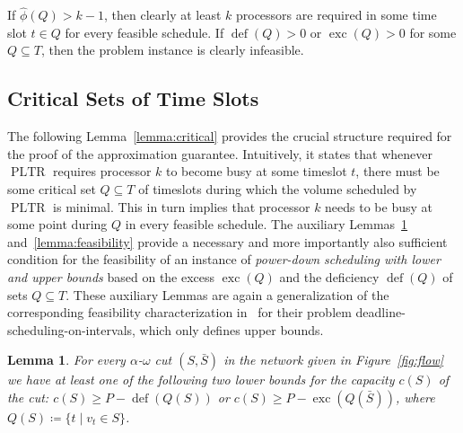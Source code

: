 \documentclass[a4paper]{article}
\DeclareMathOperator{\PLTR}{PLTR}
\DeclareMathOperator{\opdef}{def}
\DeclareMathOperator{\exc}{exc}
\newtheorem{lemma}[theorem]{Lemma}
\begin{document}
If $\hat \phi(Q) > k - 1$, then clearly at least $k$ processors are required in some time slot $t \in Q$ for every feasible schedule.
If $\opdef(Q) > 0$ or $\exc(Q) > 0$ for some $Q \subseteq T$, then the problem instance is clearly infeasible.


\subsection{Critical Sets of Time Slots}
The following Lemma~\ref{lemma:critical} provides the crucial structure required for the proof of the approximation guarantee.
Intuitively, it states that whenever $\PLTR$ requires processor $k$ to become busy at some timeslot $t$, there must be some critical set $Q \subseteq T$ of timeslots during which the volume scheduled by $\PLTR$ is minimal.
This in turn implies that processor $k$ needs to be busy at some point during $Q$ in every feasible schedule.
The auxiliary Lemmas~\ref{lemma:cut} and~\ref{lemma:feasibility} provide a necessary and more importantly also sufficient condition for the feasibility of an instance of \emph{power-down scheduling with lower and upper bounds} based on the excess $\exc(Q)$ and the deficiency $\opdef(Q)$ of sets $Q \subseteq T$.
These auxiliary Lemmas are again a generalization of the corresponding feasibility characterization in~\cite{antoniadis} for their problem deadline-scheduling-on-intervals, which only defines upper bounds.
\begin{lemma}\label{lemma:cut}
  For every $\alpha$-$\omega$ cut $(S, \bar S)$ in the network given in Figure~\ref{fig:flow} we have at least one of the following two lower bounds for the capacity $c(S)$ of the cut:
  $c(S) \geq P - \opdef(Q(S))$ or $c(S) \geq P - \exc(Q(\bar S))$, where $Q(S) \coloneqq \{ t \mid v_t \in S \}$.
\end{lemma}
\end{document}
